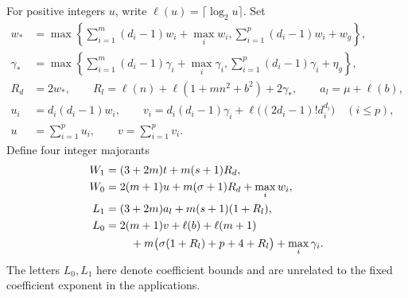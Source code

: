 \documentclass[11pt,a4paper]{article}
\begin{document}
For positive integers $u$, write $\ell(u)=\lceil\log_2u\rceil$.
Set
\begin{align*}
 w_*&=\max\left\{\sum_{i=1}^m(d_i-1)w_i+\max_iw_i,
                   \sum_{i=1}^p(d_i-1)w_i+w_g\right\},\\
 \gamma_*&=\max\left\{\sum_{i=1}^m(d_i-1)\gamma_i+\max_i\gamma_i,
                   \sum_{i=1}^p(d_i-1)\gamma_i+\eta_g\right\},\\
 R_d&=2w_*,\qquad
 R_l=\ell(n)+\ell(1+mn^2+b^2)+2\gamma_*,\qquad a_l=\mu+\ell(b),\\
 u_i&=d_i(d_i-1)w_i,\qquad
 v_i=d_i(d_i-1)\gamma_i+
                    \ell\bigl((2d_i-1)!d_i^{d_i}\bigr)\quad(i\le p),\\
 u&=\sum_{i=1}^p u_i,\qquad v=\sum_{i=1}^p v_i.
\end{align*}
Define four integer majorants
\begin{align*}
 W_1&=(3+2m)t+m(s+1)R_d,\\
 W_0&=2(m+1)u+m(\sigma+1)R_d+\max_iw_i,\\
 L_1&=(3+2m)a_l+m(s+1)(1+R_l),\\
 L_0&=2(m+1)v+\ell(b)+\ell(m+1)\\
    &\hspace{8mm}+m\bigl(\sigma(1+R_l)+p+4+R_l\bigr)+\max_i\gamma_i.
\end{align*}
The letters $L_0,L_1$ here denote coefficient bounds and are
unrelated to the fixed coefficient exponent in the applications.
\end{document}
